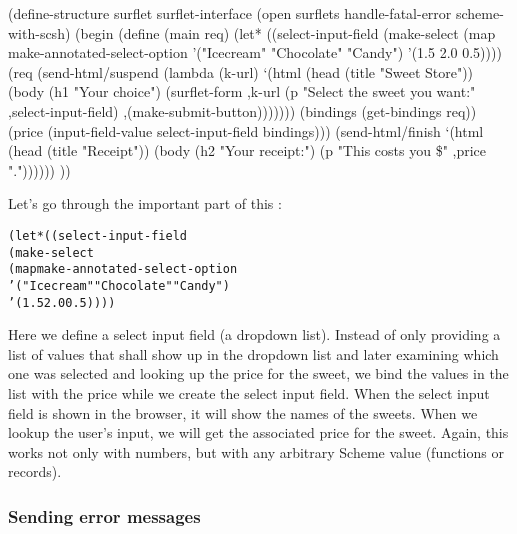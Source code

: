 \begin{listing}
(define-structure surflet surflet-interface
  (open surflets
	handle-fatal-error
        scheme-with-scsh)
  (begin
    (define (main req)
      (let* ((select-input-field 
              (make-select
               (map make-annotated-select-option
                    '("Icecream" "Chocolate" "Candy")
                    '(1.5 2.0 0.5))))
              (req (send-html/suspend
                    (lambda (k-url)
                      `(html 
                        (head (title "Sweet Store"))
                        (body
                         (h1 "Your choice")
                         (surflet-form 
                          ,k-url
                          (p "Select the sweet you want:"
                             ,select-input-field)
                          ,(make-submit-button)))))))
              (bindings (get-bindings req))
              (price (input-field-value select-input-field 
                                        bindings)))
        (send-html/finish
         `(html (head (title "Receipt"))
                (body
                 (h2 "Your receipt:")
                 (p "This costs you \$" ,price "."))))))
))
\end{listing}

Let's go through the important part of this \surflet:

\begin{alltt}
      (let* ((select-input-field 
              (make-select
               (map make-annotated-select-option
                    '("Icecream" "Chocolate" "Candy")
                    '(1.5 2.0 0.5))))
\end{alltt}

Here we define a select input field (a dropdown list).  Instead of
only providing a list of values that shall show up in the dropdown
list and later examining which one was selected and looking up the
price for the sweet, we bind the values in the list with the price
while we create the select input field.  When the select input field
is shown in the browser, it will show the names of the sweets.  When
we lookup the user's input, we will get the associated price for the
sweet.  Again, this works not only with numbers, but with any
arbitrary Scheme value (\eg functions or records).

\subsubsection{Sending error messages}

